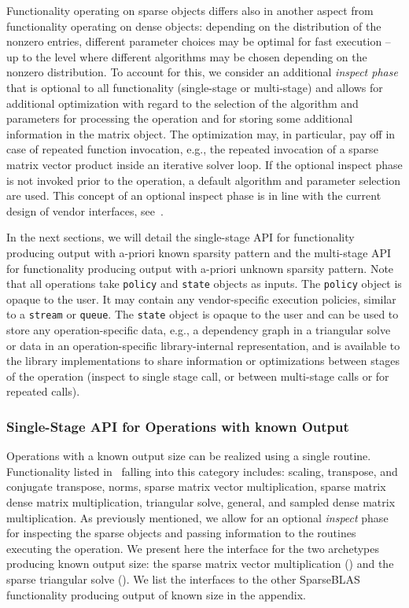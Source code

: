 \documentclass[manuscript,review]{acmart}
\begin{document}
Functionality operating on sparse objects differs also in another aspect from functionality operating on dense objects: depending on the distribution of the nonzero entries, different parameter choices may be optimal for fast execution -- up to the level where different algorithms may be chosen depending on the nonzero distribution. To account for this, we consider an additional \textit{inspect phase} that is optional to all functionality (single-stage or multi-stage) and allows for additional optimization with regard to the selection of the algorithm and parameters for processing the operation and for storing some additional information in the matrix object. The optimization may, in particular, pay off in case of repeated function invocation, e.g., the repeated invocation of a sparse matrix vector product inside an iterative solver loop. 
If the optional inspect phase is not invoked prior to the operation, a default algorithm and parameter selection are used. 
This concept of an optional inspect phase is in line with the current design of vendor interfaces, see~.



In the next sections, we will detail the single-stage API for functionality producing output with a-priori known sparsity pattern and the multi-stage API for functionality producing output with a-priori unknown sparsity pattern.
Note that all operations take \texttt{policy} and \texttt{state} objects as inputs. The \texttt{policy} object is opaque to the user. It may contain any vendor-specific execution policies, similar to a \texttt{stream} or \texttt{queue}. The \texttt{state} object is opaque to the user and can be used to store any operation-specific data, e.g., a dependency graph in a triangular solve or data in an operation-specific library-internal representation, and is available to the library implementations to share information or optimizations between stages of the operation (inspect to single stage call, or between multi-stage calls or for repeated calls).


\subsubsection{Single-Stage API for Operations with known Output}
\label{sec:single-stage-api}

Operations with a known output size can be realized using a single routine. Functionality listed in~ falling into this category includes: scaling, transpose, and conjugate transpose, norms, sparse matrix vector multiplication, sparse matrix dense matrix multiplication, triangular solve, general, and sampled dense matrix multiplication. As previously mentioned, we allow for an optional \textit{inspect} phase for inspecting the sparse objects and passing information to the routines executing the operation. We present here the interface for the two archetypes producing known output size: the sparse matrix vector multiplication () and the sparse triangular solve (). We list the interfaces to the other SparseBLAS functionality producing output of known size in the appendix.
\end{document}
